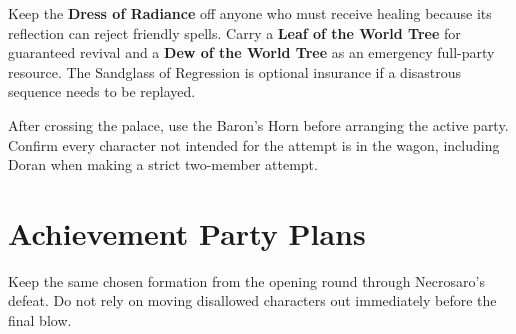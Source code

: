 \documentclass[
  american,
  10pt,
  letterpaper,
  oneside,
  open=any]{scrreprt}
\begin{document}
Keep the \textbf{Dress of Radiance} off anyone who must receive healing
because its reflection can reject friendly spells. Carry a \textbf{Leaf
of the World Tree} for guaranteed revival and a \textbf{Dew of the World
Tree} as an emergency full-party resource. The Sandglass of Regression
is optional insurance if a disastrous sequence needs to be replayed.

After crossing the palace, use the Baron's Horn before arranging the
active party. Confirm every character not intended for the attempt is in
the wagon, including Doran when making a strict two-member attempt.

\section{Achievement Party Plans}\label{achievement-party-plans}

Keep the same chosen formation from the opening round through
Necrosaro's defeat. Do not rely on moving disallowed characters out
immediately before the final blow.
\end{document}
